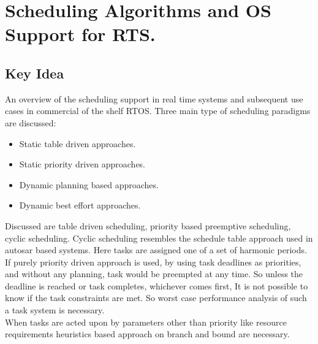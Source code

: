 \section{Scheduling Algorithms and OS Support for RTS.}
\subsection{Key Idea}
An overview of the scheduling support in real time systems and subsequent use cases in commercial of the shelf RTOS.
Three main type of scheduling paradigms are discussed:
\begin{itemize}
	\item Static table driven approaches.
	\item Static priority driven approaches.
	\item Dynamic planning based approaches.
	\item Dynamic best effort approaches.
\end{itemize}
Discussed are table driven scheduling, priority based preemptive scheduling, cyclic scheduling.
Cyclic scheduling resembles the schedule table approach used in autosar based systems. Here tasks are assigned one of a set of harmonic periods. 
If purely priority driven approach is used, by using task deadlines as priorities, and without any planning, task would be preempted at any time.
So unless the deadline is reached or task completes, whichever comes first, It is not possible to know if the task constraints are met.
So worst case performance analysis of such a task system is necessary.\\
When tasks are acted upon by parameters other than priority like resource requirements heuristics based approach on branch and bound are necessary.
